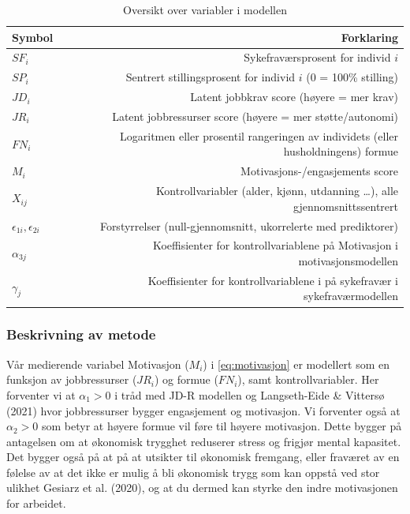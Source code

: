 \documentclass[
  12pt,
  a4paper,
  DIV=11,
  numbers=noendperiod]{scrartcl}
\begin{document}
\begin{table}[H]
\centering
\begin{tabular}{lr}
\toprule
Symbol & Forklaring \\ 
\midrule
$SF_i$ & Sykefraværsprosent for individ $i$ \\
$SP_i$ & Sentrert stillingsprosent for individ $i$ (0 = 100\% stilling) \\
$JD_i$ & Latent jobbkrav score (høyere = mer krav) \\
$JR_i$ & Latent jobbressurser score (høyere = mer støtte/autonomi) \\
$FN_i$ & Logaritmen eller prosentil rangeringen av individets (eller husholdningens) formue \\
$M_i$ & Motivasjons-/engasjements score \\
$X_{ij}$ & Kontrollvariabler (alder, kjønn, utdanning …), alle gjennomsnittssentrert \\
$\epsilon_{1i}, \epsilon_{2i}$ & Forstyrrelser (null-gjennomsnitt, ukorrelerte med prediktorer) \\  
$\alpha_{3j} $ & Koeffisienter for kontrollvariablene på Motivasjon i motivasjonsmodellen \\
$\gamma_{j} $ & Koeffisienter for kontrollvariablene i på sykefravær i sykefraværmodellen \\
\hline
\end{tabular}
\caption{Oversikt over variabler i modellen}
\label{tab:variabler}
\end{table}

\subsubsection{Beskrivning av metode}\label{beskrivning-av-metode}

Vår medierende variabel Motivasjon (\(M_i\)) i \autoref{eq:motivasjon}
er modellert som en funksjon av jobbressurser (\(JR_i\)) og formue
(\(FN_i\)), samt kontrollvariabler. Her forventer vi at \(\alpha_1 > 0\)
i tråd med JD-R modellen og Langseth-Eide \& Vittersø (2021) hvor
jobbressurser bygger engasjement og motivasjon. Vi forventer også at
\(\alpha_2 > 0\) som betyr at høyere formue vil føre til høyere
motivasjon. Dette bygger på antagelsen om at økonomisk trygghet
reduserer stress og frigjør mental kapasitet. Det bygger også på at på
at utsikter til økonomisk fremgang, eller fraværet av en følelse av at
det ikke er mulig å bli økonomisk trygg som kan oppstå ved stor ulikhet
Gesiarz et al. (2020), og at du dermed kan styrke den indre motivasjonen
for arbeidet.
\end{document}
